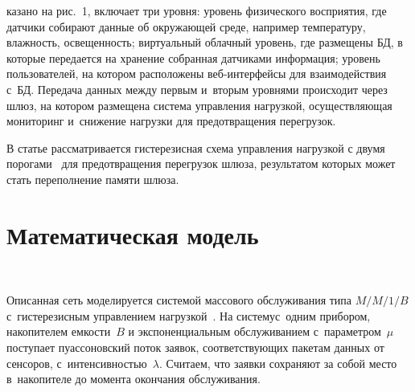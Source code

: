 \begin{multicols}{2}

\noindent
 казано 
на рис.~1, включает три уровня: уровень физического восприятия, где датчики собирают 
данные об окружающей среде, например температуру, влажность, освещенность; 
виртуальный облачный уровень, где размещены БД, в которые передается на хранение 
собранная датчиками информация; уровень пользователей, на котором расположены\linebreak  
веб-ин\-тер\-фей\-сы для взаимодействия с~БД. Передача данных между первым и~вторым 
уровнями происходит через шлюз, на котором размещена сис\-те\-ма управ\-ле\-ния нагрузкой, 
осу\-ще\-ст\-в\-ля\-ющая \mbox{мониторинг} и~снижение нагрузки для пред\-от\-вра\-ще\-ния перегрузок. 
  
  В статье рассматривается гистерезисная схема управления нагрузкой с двумя 
порогами~\cite{6-al} для пред\-от\-вра\-ще\-ния перегрузок шлюза, результатом которых может 
стать переполнение памяти \mbox{шлюза}.

\vspace*{-9pt}
  
\section{Математическая модель}

\vspace*{-3pt}

\begin{figure*} %
\vspace*{1pt}
  \begin{center}  
    \mbox{%
\epsfxsize=159.108mm
}

\end{center}
\vspace*{-6pt}
\end{figure*}

  Описанная сеть моделируется системой массового обслуживания типа $M/M/1/B$ 
с~гистерезисным управ\-ле\-ни\-ем нагрузкой~\cite{9-al}. На систему\linebreak с~одним прибором, 
накопителем емкости~$B$ и экспоненциальным обслуживанием с~па\-ра\-мет\-ром~$\mu$ 
поступает пуассоновский поток заявок, соответствующих пакетам данных от сенсоров, 
с~ин\-тен\-сив\-ностью~$\lambda$. Считаем, что заявки сохраняют за собой место в~накопителе 
до момента окончания обслуживания. 


\end{multicols}

